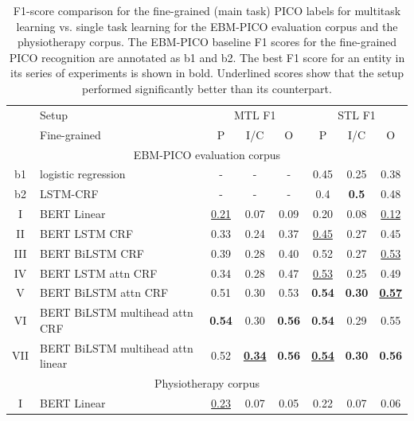 \documentclass[runningheads]{llncs}
\begin{document}
\begin{table}[h!]
    \centering
    \caption{F1-score comparison for the fine-grained (main task) PICO labels for multitask learning vs. single task learning for the EBM-PICO evaluation corpus and the physiotherapy corpus. The EBM-PICO baseline F1 scores for the fine-grained PICO recognition are annotated as b1 and b2. The best F1 score for an entity in its series of experiments is shown in bold. Underlined scores show that the setup performed significantly better than its counterpart.}
    \label{tab:f1EBMfine}
    \begin{tabular}{clccc|ccc}
        \Xhline{1pt}
         & Setup & \multicolumn{3}{c}{MTL F1}  & \multicolumn{3}{c}{STL F1} \\
        \Xhline{1pt}
         & Fine-grained & P & I/C & O & P & I/C & O \\
        \hline 
        \multicolumn{8}{c}{EBM-PICO evaluation corpus}  \\
        \hline
        b1 & logistic regression & - & - & - & 0.45 & 0.25 & 0.38 \\
        b2 & LSTM-CRF & - & - & - & 0.4 & \textbf{0.5} & 0.48 \\
        \hline
        I & BERT Linear & \underline{0.21} & 0.07 & 0.09 & 0.20 & 0.08 & \underline{0.12} \\
        II & BERT LSTM CRF & 0.33 & 0.24 & 0.37 &  \underline{0.45} & 0.27 & 0.45 \\
        III & BERT BiLSTM CRF & 0.39 & 0.28 & 0.40 & 0.52 & 0.27 & \underline{0.53} \\
        IV & BERT LSTM attn CRF & 0.34 & 0.28 & 0.47 & \underline{0.53} & 0.25 & 0.49 \\
        V & BERT BiLSTM attn CRF & 0.51 & 0.30 & 0.53 & \textbf{0.54} & \textbf{0.30} & \underline{\textbf{0.57}} \\
        VI & BERT BiLSTM multihead attn CRF & \textbf{0.54} & 0.30 & \textbf{0.56} & \textbf{0.54} & 0.29 & 0.55 \\
        VII & BERT BiLSTM multihead attn linear & 0.52 & \underline{\textbf{0.34}} & \textbf{0.56} & \underline{\textbf{0.54}} & \textbf{0.30} & \textbf{0.56} \\
        \hline 
        \multicolumn{8}{c}{Physiotherapy corpus}  \\
        \hline 
        I & BERT Linear & \underline{0.23} & 0.07 & 0.05 & 0.22 & 0.07 & 0.06 \\

\end{tabular}
\end{table}
\end{document}
